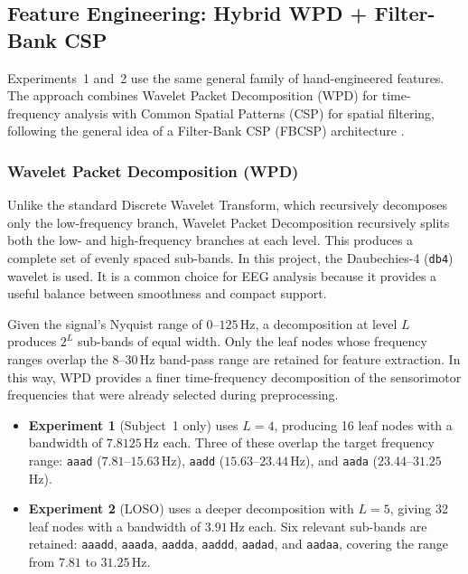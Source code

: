 \documentclass[11pt,a4paper]{article}
\begin{document}
	\subsection{Feature Engineering: Hybrid WPD + Filter-Bank CSP}
	\label{sec:features}
	
	Experiments~1 and~2 use the same general family of hand-engineered features. The approach combines
	Wavelet Packet Decomposition (WPD) for time-frequency analysis with Common Spatial Patterns (CSP)
	for spatial filtering, following the general idea of a Filter-Bank CSP (FBCSP) architecture
	\cite{ang2008fbcsp}.
	
	\subsubsection{Wavelet Packet Decomposition (WPD)}
	
	Unlike the standard Discrete Wavelet Transform, which recursively decomposes only the low-frequency
	branch, Wavelet Packet Decomposition recursively splits both the low- and high-frequency branches
	at each level. This produces a complete set of evenly spaced sub-bands. In this project, the
	Daubechies-4 (\texttt{db4}) wavelet is used. It is a common choice for EEG analysis because it
	provides a useful balance between smoothness and compact support.
	
	Given the signal's Nyquist range of $0$--$125$\,Hz, a decomposition at level $L$ produces
	$2^L$ sub-bands of equal width. Only the leaf nodes whose frequency ranges overlap the
	$8$--$30$\,Hz band-pass range are retained for feature extraction. In this way, WPD provides
	a finer time-frequency decomposition of the sensorimotor frequencies that were already selected
	during preprocessing.
	
	\begin{itemize}[leftmargin=1.2cm]
		\item \textbf{Experiment 1} (Subject~1 only) uses $L=4$, producing 16 leaf nodes with a
		bandwidth of $7.8125$\,Hz each. Three of these overlap the target frequency range:
		\texttt{aaad} ($7.81$--$15.63$\,Hz),
		\texttt{aadd} ($15.63$--$23.44$\,Hz), and
		\texttt{aada} ($23.44$--$31.25$\,Hz).
		
		\item \textbf{Experiment 2} (LOSO) uses a deeper decomposition with $L=5$, giving 32 leaf
		nodes with a bandwidth of $3.91$\,Hz each. Six relevant sub-bands are retained:
		\texttt{aaadd}, \texttt{aaada}, \texttt{aadda}, \texttt{aaddd}, \texttt{aadad}, and
		\texttt{aadaa}, covering the range from $7.81$ to $31.25$\,Hz.
	\end{itemize}
	
\end{document}
